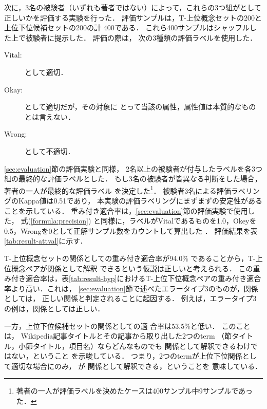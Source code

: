 \documentclass[japanese]{jnlp_1.4}
\newcommand{\attval}[3]{}
\begin{document}
次に，3名の被験者（いずれも著者ではない）によって，これらの3つ組が\attval{対象}{属性}{属性値}として正しいかを評価する実験を行った．
評価サンプルは，T-上位概念セットの200と上位下位候補セットの200の計
400である．
これら400サンプルはシャッフルした上で被験者に提示した．
評価の際は，
次の3種類の評価ラベルを使用した．

\begin{description}
 \item[Vital:] \attval{対象}{属性}{属性値}として適切．
 \item[Okay:] \attval{対象}{属性}{属性値}として適切だが，その対象に
	    とって当該の属性，属性値は本質的なものとは言えない．
 \item[Wrong:] \attval{対象}{属性}{属性値}として不適切．
\end{description}

\ref{sec:evaluation}節の評価実験と同様，
2名以上の被験者が付与したラベルを各3つ組の最終的な評価ラベルとした．
もし3名の被験者が皆異なる判断をした場合，著者の一人が最終的な評価ラベル
を決定した\footnote{
著者の一人が評価ラベルを決めたケースは400サンプル中9サンプルであった．}．
被験者3名による評価ラベリングのKappa値は0.51であり，
本実験の評価ラベリングにまずまずの安定性があることを示している．
重み付き適合率は，\ref{sec:evaluation}節の評価実験で使用した，
式(\ref{formula:precision})
と同様に，ラベルがVitalであるものを1.0，Okeyを0.5，Wrongを0として正解サンプル数をカウントして算出した
\cite{pasca2007,pasca2009}．
評価結果を表\ref{tab:result-attval}に示す．

\begin{table}[b]
\caption{T-上位概念ペアの\attval{対象}{属性}{属性値}としての評価結果}
\label{tab:result-attval}

\end{table}

T-上位概念セットの\attval{対象}{属性}{属性値}関係としての重み付き適合率が94.0\%
であることから，T-上位概念ペアが\attval{対象}{属性}{属性値}関係として解釈
できるという仮説は正しいと考えられる．
この重み付き適合率は，表\ref{tab:result-hyp}におけるT-上位下位概念ペアの重み付き適合率より高い．これは，
\ref{sec:evaluation}節で述べたエラータイプ3のものが，\attval{対象}{属性}{属性値}関係としては，
正しい関係と判定されることに起因する．
例えば，エラータイプ3の例\attval{大垣市}{公共施設}{図書館}は，\attval{対象}{属性}{属性値}関係としては正しい．

一方，上位下位候補セットの\attval{対象}{属性}{属性値}関係としての適
合率は53.5\%と低い．
このことは，
Wikipedia記事タイトルとその記事から取り出した2つのterm
（節タイトル，小節タイトル，項目名）ならどんなものでも
\attval{対象}{属性}{属性値}関係として解釈できるわけではない，ということ
を示唆している．
つまり，2つのtermが上位下位関係として適切な場合にのみ，
\attval{Wikipedia記事タイトル}{上位概念のterm}{下位概念のterm}が
\attval{対象}{属性}{属性値}関係として解釈できる，ということを
意味している．
\end{document}
